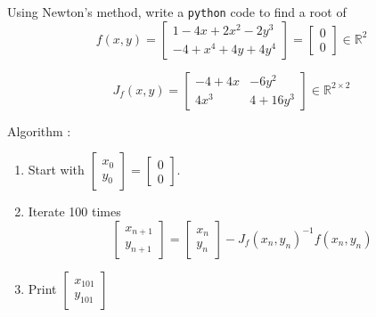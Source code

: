 \documentclass{beamer}
\begin{document}
\begin{frame}
Using Newton's method, write a \texttt{python} code to find a root of 
\begin{equation}
	f(x,y) = 
	\begin{bmatrix}
		1 - 4x + 2x^2 - 2y^3\\
		-4 + x^4 + 4y + 4y^4
	\end{bmatrix}
	= 
	\begin{bmatrix}
		0 \\ 0
	\end{bmatrix}
	\in \mathbb{R}^{2}
\end{equation}

\begin{equation}
	J_f(x,y) = 
	\begin{bmatrix}
		-4 + 4x & -6y^2\\
		4x^3 & 4 +16y^3
	\end{bmatrix}\in \mathbb{R}^{2\times 2}
\end{equation}

Algorithm : 
\begin{enumerate}
	\item Start with $\begin{bmatrix}
		 	x_{0}\\y_{0}
		 \end{bmatrix} 
	= 
	\begin{bmatrix}
		0 \\ 0
	\end{bmatrix}$.
	\item Iterate 100 times
	\begin{equation}
		\begin{bmatrix}
		 	x_{n+1}\\y_{n+1}
		 \end{bmatrix} 
		 = 
		 \begin{bmatrix}
		 	x_{n}\\y_{n}
		 \end{bmatrix} 
		 - J_f(x_n, y_n)^{-1}f(x_n, y_n)
	\end{equation}
	\item Print $\begin{bmatrix}
		 	x_{101}\\y_{101}
		 \end{bmatrix} $
\end{enumerate}

\end{frame}
\end{document}
